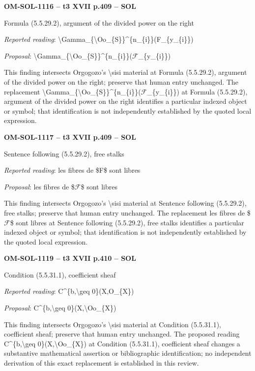 \par\noindent\textbf{OM-SOL-1116 -- t3 XVII p.409 -- SOL}\par
Formula (5.5.29.2), argument of the divided power on the right\par
\emph{Reported reading}: \textbackslash{}Gamma\_\{\textbackslash{}Oo\_\{S\}\}\textasciicircum{}\{n\_\{i\}\}(F\_\{y\_\{i\}\})\par
\emph{Proposal}: \textbackslash{}Gamma\_\{\textbackslash{}Oo\_\{S\}\}\textasciicircum{}\{n\_\{i\}\}(\ensuremath{\mathcal{F}}\_\{y\_\{i\}\})\par
This finding intersects Orgogozo's \textbackslash{}sisi material at Formula (5.5.29.2), argument of the divided power on the right; preserve that human entry unchanged. The replacement \textbackslash{}Gamma\_\{\textbackslash{}Oo\_\{S\}\}\textasciicircum{}\{n\_\{i\}\}(\ensuremath{\mathcal{F}}\_\{y\_\{i\}\}) at Formula (5.5.29.2), argument of the divided power on the right identifies a particular indexed object or symbol; that identification is not independently established by the quoted local expression.\par
\par\noindent\textbf{OM-SOL-1117 -- t3 XVII p.409 -- SOL}\par
Sentence following (5.5.29.2), free stalks\par
\emph{Reported reading}: les fibres de \$F\$ sont libres\par
\emph{Proposal}: les fibres de \$\ensuremath{\mathcal{F}}\$ sont libres\par
This finding intersects Orgogozo's \textbackslash{}sisi material at Sentence following (5.5.29.2), free stalks; preserve that human entry unchanged. The replacement les fibres de \$\ensuremath{\mathcal{F}}\$ sont libres at Sentence following (5.5.29.2), free stalks identifies a particular indexed object or symbol; that identification is not independently established by the quoted local expression.\par
\par\noindent\textbf{OM-SOL-1119 -- t3 XVII p.410 -- SOL}\par
Condition (5.5.31.1), coefficient sheaf\par
\emph{Reported reading}: C\textasciicircum{}\{b,\textbackslash{}geq 0\}(X,O\_\{X\})\par
\emph{Proposal}: C\textasciicircum{}\{b,\textbackslash{}geq 0\}(X,\textbackslash{}Oo\_\{X\})\par
This finding intersects Orgogozo's \textbackslash{}sisi material at Condition (5.5.31.1), coefficient sheaf; preserve that human entry unchanged. The proposed reading C\textasciicircum{}\{b,\textbackslash{}geq 0\}(X,\textbackslash{}Oo\_\{X\}) at Condition (5.5.31.1), coefficient sheaf changes a substantive mathematical assertion or bibliographic identification; no independent derivation of this exact replacement is established in this review.\par
